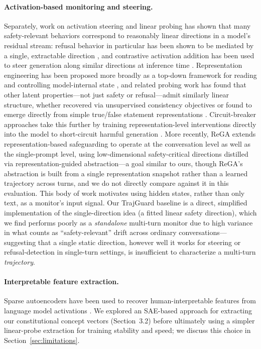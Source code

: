 \documentclass[11pt]{article}
\begin{document}
\paragraph{Activation-based monitoring and steering.} Separately, work on activation steering and linear probing has shown that many safety-relevant behaviors correspond to reasonably linear directions in a model's residual stream: refusal behavior in particular has been shown to be mediated by a single, extractable direction \citep{arditi2024refusal}, and contrastive activation addition has been used to steer generation along similar directions at inference time \citep{rimsky2023caa}. Representation engineering has been proposed more broadly as a top-down framework for reading and controlling model-internal state \citep{zou2023repe}, and related probing work has found that other latent properties---not just safety or refusal---admit similarly linear structure, whether recovered via unsupervised consistency objectives \citep{burns2022latentknowledge} or found to emerge directly from simple true/false statement representations \citep{marks2023geometryoftruth}. Circuit-breaker approaches take this further by training representation-level interventions directly into the model to short-circuit harmful generation \citep{zou2024circuitbreakers}. More recently, ReGA \citep{wei2025rega} extends representation-based safeguarding to operate at the conversation level as well as the single-prompt level, using low-dimensional safety-critical directions distilled via representation-guided abstraction---a goal similar to ours, though ReGA's abstraction is built from a single representation snapshot rather than a learned trajectory across turns, and we do not directly compare against it in this evaluation. This body of work motivates using hidden states, rather than only text, as a monitor's input signal. Our TrajGuard baseline is a direct, simplified implementation of the single-direction idea (a fitted linear safety direction), which we find performs poorly as a \emph{standalone} multi-turn monitor due to high variance in what counts as ``safety-relevant'' drift across ordinary conversations---suggesting that a single static direction, however well it works for steering or refusal-detection in single-turn settings, is insufficient to characterize a multi-turn \emph{trajectory}.

\paragraph{Interpretable feature extraction.} Sparse autoencoders have been used to recover human-interpretable features from language model activations \citep{cunningham2023sae}. We explored an SAE-based approach for extracting our constitutional concept vectors (Section~3.2) before ultimately using a simpler linear-probe extraction for training stability and speed; we discuss this choice in Section~\ref{sec:limitations}.
\end{document}
